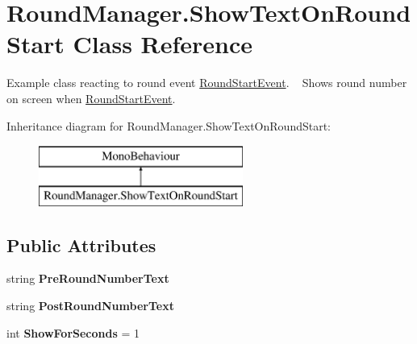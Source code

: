 \hypertarget{class_round_manager_1_1_show_text_on_round_start}{}\section{Round\+Manager.\+Show\+Text\+On\+Round\+Start Class Reference}
\label{class_round_manager_1_1_show_text_on_round_start}


Example class reacting to round event \hyperlink{class_round_manager_1_1_events_1_1_round_start_event}{Round\+Start\+Event}. ~\newline
Shows round number on screen when \hyperlink{class_round_manager_1_1_events_1_1_round_start_event}{Round\+Start\+Event}.  


Inheritance diagram for Round\+Manager.\+Show\+Text\+On\+Round\+Start\+:\begin{figure}[H]
\begin{center}
\leavevmode
\includegraphics[height=2.000000cm]{class_round_manager_1_1_show_text_on_round_start}
\end{center}
\end{figure}
\subsection*{Public Attributes}
\begin{DoxyCompactItemize}
\item 
\hypertarget{class_round_manager_1_1_show_text_on_round_start_aebad0b6e62010a4b000d1253733bf252}{}string {\bfseries Pre\+Round\+Number\+Text}\label{class_round_manager_1_1_show_text_on_round_start_aebad0b6e62010a4b000d1253733bf252}

\item 
\hypertarget{class_round_manager_1_1_show_text_on_round_start_a3134e526bd18771b45dab725fbb43ad9}{}string {\bfseries Post\+Round\+Number\+Text}\label{class_round_manager_1_1_show_text_on_round_start_a3134e526bd18771b45dab725fbb43ad9}

\item 
\hypertarget{class_round_manager_1_1_show_text_on_round_start_ae9a9ab6bae6699b5f2e8af98aafcd525}{}int {\bfseries Show\+For\+Seconds} = 1\label{class_round_manager_1_1_show_text_on_round_start_ae9a9ab6bae6699b5f2e8af98aafcd525}

\end{DoxyCompactItemize}


